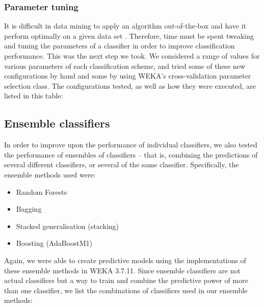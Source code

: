 \subsubsection{Parameter tuning}
It is difficult in data mining to apply an algorithm out-of-the-box and have
it perform optimally on a given data set \citep{Witten2005}. Therefore, time
must be spent tweaking and tuning the parameters of a classifier in order to
improve classification performance. This was the next step we took. We
considered a range of values for various parameters of each classification
scheme, and tried some of these new configurations by hand and some by using
WEKA's cross-validation parameter selection class. The configurations tested,
as well as how they were executed, are listed in this table:

\subsection{Ensemble classifiers}
In order to improve upon the performance of individual classifiers, we also
tested the performance of ensembles of classifiers -- that is, combining the
predictions of several different classifiers, or several of the same
classifier. Specifically, the ensemble methods used were:
\begin{itemize}
  \item Random Forests
  \item Bagging
  \item Stacked generalisation (stacking)
  \item Boosting (AdaBoostM1)
\end{itemize}

Again, we were able to create predictive models using the implementations of
these ensemble methods in WEKA 3.7.11. Since ensemble classifiers are not
actual classifiers but a way to train and combine the predictive power of more
than one classifier, we list the combinations of classifiers used in our
ensemble methods:


